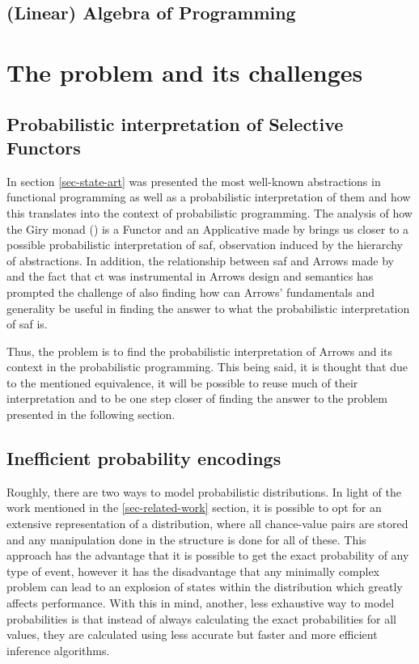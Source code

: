 \documentclass[
  oneside,
  11pt, a4paper,
  footinclude=true,
  headinclude=true,
  cleardoublepage=empty
]{scrbook}
\theoremstyle{definition}
\theoremstyle{definition}
\begin{document}
    \section{(Linear) Algebra of Programming}
    
	\chapter{The problem and its challenges}\label{ch-problem}
	
	\section{Probabilistic interpretation of Selective Functors}
	
	In section \ref{sec-state-art} was presented the most well-known abstractions in functional programming as well as a probabilistic interpretation of them and how this translates into the context of probabilistic programming. The analysis of how the Giry monad (\cite{giry1982}) is a Functor and an Applicative made by \cite{jtobin} brings us closer to a possible probabilistic interpretation of \gls{saf}, observation induced by the hierarchy of abstractions. In addition, the relationship between \gls{saf} and Arrows made by \cite{andrey2019selective} and the fact that \gls{ct} was instrumental in Arrows design and semantics has prompted the challenge of also finding how can Arrows' fundamentals and generality be useful in finding the answer to what the probabilistic interpretation of \gls{saf} is.

    Thus, the problem is to find the probabilistic interpretation of Arrows and its context in the probabilistic programming. This being said, it is thought that due to the mentioned equivalence, it will be possible to reuse much of their interpretation and to be one step closer of finding the answer to the problem presented in the following section.

	\section{Inefficient probability encodings}
	
	Roughly, there are two ways to model probabilistic distributions. In light of the work mentioned in the \ref{sec-related-work} section, it is possible to opt for an extensive representation of a distribution, where all chance-value pairs are stored and any manipulation done in the structure is done for all of these. This approach has the advantage that it is possible to get the exact probability of any type of event, however it has the disadvantage that any minimally complex problem can lead to an explosion of states within the distribution which greatly affects performance. With this in mind, another, less exhaustive way to model probabilities is that instead of always calculating the exact probabilities for all values, they are calculated using less accurate but faster and more efficient inference algorithms.
\end{document}
